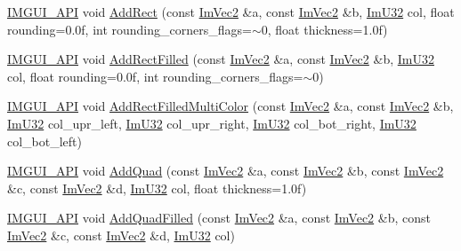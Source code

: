 \begin{DoxyCompactItemize}
\item 
\mbox{\hyperlink{imgui_8h_a43829975e84e45d1149597467a14bbf5}{I\+M\+G\+U\+I\+\_\+\+A\+PI}} void \mbox{\hyperlink{struct_im_draw_list_a6738c7d0b696273a37808554e1f15a0a}{Add\+Rect}} (const \mbox{\hyperlink{struct_im_vec2}{Im\+Vec2}} \&a, const \mbox{\hyperlink{struct_im_vec2}{Im\+Vec2}} \&b, \mbox{\hyperlink{imgui_8h_a118cff4eeb8d00e7d07ce3d6460eed36}{Im\+U32}} col, float rounding=0.\+0f, int rounding\+\_\+corners\+\_\+flags=$\sim$0, float thickness=1.\+0f)
\item 
\mbox{\hyperlink{imgui_8h_a43829975e84e45d1149597467a14bbf5}{I\+M\+G\+U\+I\+\_\+\+A\+PI}} void \mbox{\hyperlink{struct_im_draw_list_a1fa7c9165958909bba53c9740a607872}{Add\+Rect\+Filled}} (const \mbox{\hyperlink{struct_im_vec2}{Im\+Vec2}} \&a, const \mbox{\hyperlink{struct_im_vec2}{Im\+Vec2}} \&b, \mbox{\hyperlink{imgui_8h_a118cff4eeb8d00e7d07ce3d6460eed36}{Im\+U32}} col, float rounding=0.\+0f, int rounding\+\_\+corners\+\_\+flags=$\sim$0)
\item 
\mbox{\hyperlink{imgui_8h_a43829975e84e45d1149597467a14bbf5}{I\+M\+G\+U\+I\+\_\+\+A\+PI}} void \mbox{\hyperlink{struct_im_draw_list_ab658e574f3ef67a8d6cc0a86f13f5176}{Add\+Rect\+Filled\+Multi\+Color}} (const \mbox{\hyperlink{struct_im_vec2}{Im\+Vec2}} \&a, const \mbox{\hyperlink{struct_im_vec2}{Im\+Vec2}} \&b, \mbox{\hyperlink{imgui_8h_a118cff4eeb8d00e7d07ce3d6460eed36}{Im\+U32}} col\+\_\+upr\+\_\+left, \mbox{\hyperlink{imgui_8h_a118cff4eeb8d00e7d07ce3d6460eed36}{Im\+U32}} col\+\_\+upr\+\_\+right, \mbox{\hyperlink{imgui_8h_a118cff4eeb8d00e7d07ce3d6460eed36}{Im\+U32}} col\+\_\+bot\+\_\+right, \mbox{\hyperlink{imgui_8h_a118cff4eeb8d00e7d07ce3d6460eed36}{Im\+U32}} col\+\_\+bot\+\_\+left)
\item 
\mbox{\hyperlink{imgui_8h_a43829975e84e45d1149597467a14bbf5}{I\+M\+G\+U\+I\+\_\+\+A\+PI}} void \mbox{\hyperlink{struct_im_draw_list_ac3fd62862000b2a7a4e7f61da0a4e3fd}{Add\+Quad}} (const \mbox{\hyperlink{struct_im_vec2}{Im\+Vec2}} \&a, const \mbox{\hyperlink{struct_im_vec2}{Im\+Vec2}} \&b, const \mbox{\hyperlink{struct_im_vec2}{Im\+Vec2}} \&c, const \mbox{\hyperlink{struct_im_vec2}{Im\+Vec2}} \&d, \mbox{\hyperlink{imgui_8h_a118cff4eeb8d00e7d07ce3d6460eed36}{Im\+U32}} col, float thickness=1.\+0f)
\item 
\mbox{\hyperlink{imgui_8h_a43829975e84e45d1149597467a14bbf5}{I\+M\+G\+U\+I\+\_\+\+A\+PI}} void \mbox{\hyperlink{struct_im_draw_list_abefdc71c2dc6b6331193aee3ff680ed0}{Add\+Quad\+Filled}} (const \mbox{\hyperlink{struct_im_vec2}{Im\+Vec2}} \&a, const \mbox{\hyperlink{struct_im_vec2}{Im\+Vec2}} \&b, const \mbox{\hyperlink{struct_im_vec2}{Im\+Vec2}} \&c, const \mbox{\hyperlink{struct_im_vec2}{Im\+Vec2}} \&d, \mbox{\hyperlink{imgui_8h_a118cff4eeb8d00e7d07ce3d6460eed36}{Im\+U32}} col)

\end{DoxyCompactItemize}
